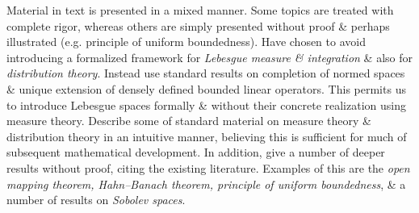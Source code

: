 \documentclass{article}
\begin{document}
\begin{itemize}
	Material in text is presented in a mixed manner. Some topics are treated with complete rigor, whereas others are simply presented without proof \& perhaps illustrated (e.g. principle of uniform boundedness). Have chosen to avoid introducing a formalized framework for {\it Lebesgue measure \& integration} \& also for {\it distribution theory}. Instead use standard results on completion of normed spaces \& unique extension of densely defined bounded linear operators. This permits us to introduce Lebesgue spaces formally \& without their concrete realization using measure theory. Describe some of standard material on measure theory \& distribution theory in an intuitive manner, believing this is sufficient for much of subsequent mathematical development. In addition, give a number of deeper results without proof, citing the existing literature. Examples of this are the {\it open mapping theorem, Hahn--Banach theorem, principle of uniform boundedness}, \& a number of results on {\it Sobolev spaces}.	


\end{itemize}
\end{document}
